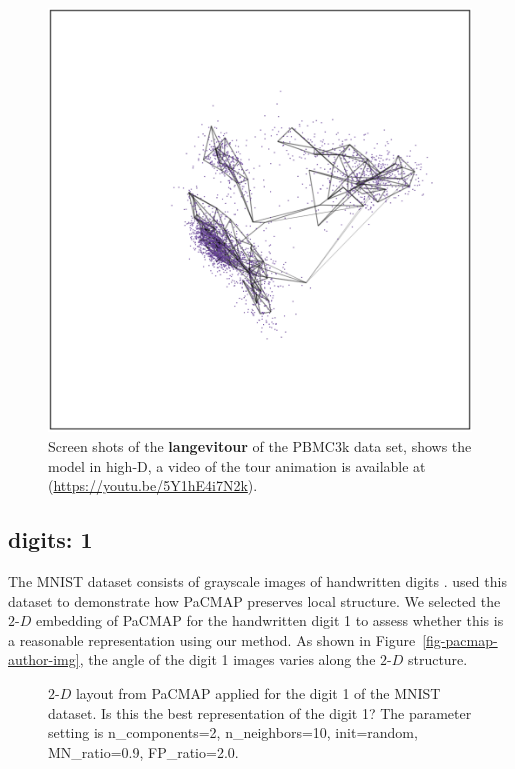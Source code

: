 \documentclass[
  12pt]{article}
\newcommand\gD{$2\text{-}D$}
\begin{document}
\begin{figure}[H]
%
\begin{minipage}{0.33\linewidth}
\includegraphics{figures/pbmc3k/sc_6.png}\end{minipage}%

\caption{\label{fig-pbmc2_sc}Screen shots of the \textbf{langevitour} of
the PBMC3k data set, shows the model in high-D, a video of the tour
animation is available at (\url{https://youtu.be/5Y1hE4i7N2k}).}

\end{figure}%

\subsection{digits: 1}\label{digits-1}

The MNIST dataset consists of grayscale images of handwritten digits
\citep{lecun2010}. \citet{yingfan2021} used this dataset to demonstrate
how PaCMAP preserves local structure. We selected the \gD{} embedding of
PaCMAP for the handwritten digit 1 to assess whether this is a
reasonable representation using our method. As shown in
Figure~\ref{fig-pacmap-author-img}, the angle of the digit 1 images
varies along the \gD{} structure.

\begin{figure}[H]


\caption{\label{fig-pacmap-author}\(2\text{-}D\) layout from PaCMAP
applied for the digit 1 of the MNIST dataset. Is this the best
representation of the digit 1? The parameter setting is n\_components=2,
n\_neighbors=10, init=random, MN\_ratio=0.9, FP\_ratio=2.0.}

\end{figure}%
\end{document}
